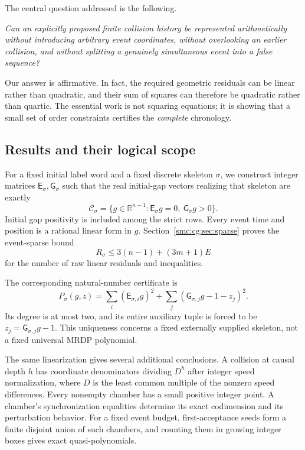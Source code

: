 \documentclass[11pt,letterpaper]{article}
\numberwithin{equation}{section}
\theoremstyle{definition}
\theoremstyle{remark}
\newcommand{\R}{\mathbb R}
\newcommand{\Ccal}{\mathcal C}
\begin{document}
The central question addressed is the following.

\medskip
\noindent\emph{Can an explicitly proposed finite collision history be
represented arithmetically without introducing arbitrary event coordinates,
without overlooking an earlier collision, and without splitting a genuinely
simultaneous event into a false sequence?}
\medskip

Our answer is affirmative. In fact, the required geometric residuals can be
linear rather than quadratic, and their sum of squares can therefore be
quadratic rather than quartic. The essential work is not squaring equations;
it is showing that a small set of order constraints certifies the
\emph{complete} chronology.

\subsection{Results and their logical scope}

For a fixed initial label word and a fixed discrete skeleton $\sigma$, we
construct integer matrices $\mathsf E_\sigma,\mathsf G_\sigma$ such that the
real initial-gap vectors realizing that skeleton are exactly
\begin{equation}
 \Ccal_\sigma=
 \{g\in\R^{n-1}:\mathsf E_\sigma g=0,
                         \ \mathsf G_\sigma g>0\}.
 \label{smc:cg:eq:mainchamber}
\end{equation}
Initial gap positivity is included among the strict rows. Every event time
and position is a rational linear form in $g$. Section~\ref{smc:cg:sec:sparse}
proves the event-sparse bound
\begin{equation}
 R_\sigma\le 3(n-1)+(3m+1)E
 \label{smc:cg:eq:mainbound}
\end{equation}
for the number of raw linear residuals and inequalities.

The corresponding natural-number certificate is
\begin{equation}
 P_\sigma(g,z)=
 \sum_i(\mathsf E_{\sigma,i}g)^2+
 \sum_j(\mathsf G_{\sigma,j}g-1-z_j)^2.
 \label{smc:cg:eq:mainpoly}
\end{equation}
Its degree is at most two, and its entire auxiliary tuple is forced to be
$z_j=\mathsf G_{\sigma,j}g-1$. This uniqueness concerns a fixed externally
supplied skeleton, not a fixed universal MRDP polynomial.

The same linearization gives several additional conclusions. A collision at
causal depth $h$ has coordinate denominators dividing $D^h$ after integer
speed normalization, where $D$ is the least common multiple of the nonzero
speed differences. Every nonempty chamber has a small positive integer
point. A chamber's synchronization equalities determine its exact
codimension and its perturbation behavior. For a fixed event budget,
first-acceptance seeds form a finite disjoint union of such chambers, and
counting them in growing integer boxes gives exact quasi-polynomials.
\end{document}
